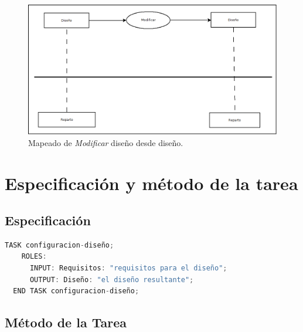 \begin{figure}[H]
  \centering
  \includegraphics[scale=0.35]{imaxes/DisenoModificarDiseno.png}
  \caption{\label{fig:DisenoModificarDiseno}Mapeado de \textit{Modificar} diseño desde diseño.}
\end{figure}


\section{Especificación y método de la tarea}

\subsection{Especificación}

\begin{lstlisting}[language=C,caption=\textbf{Especificación}]
  TASK configuracion-diseño;
    ROLES:
      INPUT: Requisitos: "requisitos para el diseño";
      OUTPUT: Diseño: "el diseño resultante";
  END TASK configuracion-diseño;
\end{lstlisting}

\newpage
\subsection{Método de la Tarea}

